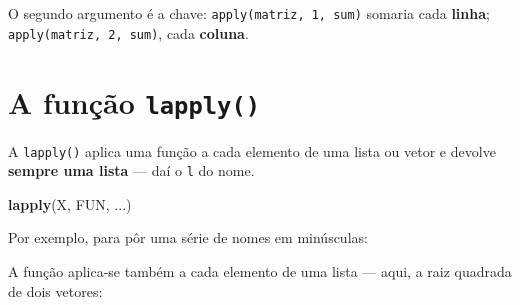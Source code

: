 \documentclass[
  portuguese,
  11pt,
  openany]{book}
\newenvironment{Shaded}{\begin{snugshade}}{\end{snugshade}}
\newcommand{\AttributeTok}[1]{\textcolor[rgb]{0.13,0.29,0.53}{#1}}
\newcommand{\DecValTok}[1]{\textcolor[rgb]{0.00,0.00,0.81}{#1}}
\newcommand{\DocumentationTok}[1]{\textcolor[rgb]{0.56,0.35,0.01}{\textbf{\textit{#1}}}}
\newcommand{\FunctionTok}[1]{\textcolor[rgb]{0.13,0.29,0.53}{\textbf{#1}}}
\newcommand{\NormalTok}[1]{#1}
\newcommand{\OtherTok}[1]{\textcolor[rgb]{0.56,0.35,0.01}{#1}}
\newcommand{\SpecialCharTok}[1]{\textcolor[rgb]{0.81,0.36,0.00}{\textbf{#1}}}
\newcommand{\StringTok}[1]{\textcolor[rgb]{0.31,0.60,0.02}{#1}}
\begin{document}
O segundo argumento é a chave: \texttt{apply(matriz,\ 1,\ sum)} somaria cada \textbf{linha};
\texttt{apply(matriz,\ 2,\ sum)}, cada \textbf{coluna}.

\section{\texorpdfstring{A função \texttt{lapply()}}{A função lapply()}}\label{a-funuxe7uxe3o-lapply}

A \texttt{lapply()} aplica uma função a cada elemento de uma lista ou vetor e devolve
\textbf{sempre uma lista} --- daí o \texttt{l} do nome.

\begin{Shaded}
\begin{Highlighting}[]
\FunctionTok{lapply}\NormalTok{(X, FUN, ...)}
\end{Highlighting}
\end{Shaded}

Por exemplo, para pôr uma série de nomes em minúsculas:

\begin{Shaded}
\end{Shaded}

A função aplica-se também a cada elemento de uma lista --- aqui, a raiz quadrada de dois
vetores:

\begin{Shaded}
\end{Shaded}
\end{document}
